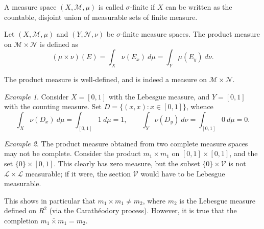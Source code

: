 \documentclass[11pt]{article}
\newcommand{\M}{\mathcal{M}}
\newcommand{\MN}{\mathcal{N}}
\renewcommand{\L}{\mathcal{L}}
\theoremstyle{definition}
\theoremstyle{remark}
\newtheorem*{example}{Example}
\numberwithin{equation}{section}
\begin{document}
    \begin{definition}
        A measure space $(X, \M, \mu)$ is called $\sigma$-finite if $X$ can be
        written as the countable, disjoint union of measurable sets of finite
        measure.
    \end{definition}

    \begin{definition}
        Let $(X, \M, \mu)$ and $(Y, \MN, \nu)$ be $\sigma$-finite measure spaces.
        The product measure on $\M \times \MN$ is defined as \[
            (\mu \times \nu)(E) = \int_X \nu(E_x)\:d\mu = \int_Y \mu(E_y)\:d\nu.
        \]
    \end{definition}

    \begin{lemma}
        The product measure is well-defined, and is indeed a measure on $\M\times
        \MN$.
    \end{lemma}

    \begin{example}
        Consider $X = [0, 1]$ with the Lebesgue measure, and $Y = [0, 1]$ with the
        counting measure. Set $D = \{(x, x): x \in [0, 1]\}$, whence \[
            \int_{X}\nu(D_x)\:d\mu = \int_{[0, 1]} 1\:d\mu = 1, \qquad
            \int_{Y}\nu(D_y)\:d\nu = \int_{[0, 1]} 0\:d\mu = 0.
        \]
    \end{example}

    \begin{example}
        The product measure obtained from two complete measure spaces may not be
        complete. Consider the product $m_1 \times m_1$ on $[0, 1] \times [0, 1]$,
        and the set $\{0\} \times [0, 1]$. This clearly has zero measure, but the
        subset $\{0\} \times \mathcal{V}$ is not $\L\times \L$ measurable; if it
        were, the section $\mathcal{V}$ would have to be Lebesgue measurable.

        This shows in particular that $m_1 \times m_1 \neq m_2$, where $m_2$ is the
        Lebesgue measure defined on $R^2$ (via the Carath\'eodory process). However,
        it is true that the completion $\overline{m_1 \times m_1} = m_2$.
    \end{example}
\end{document}
